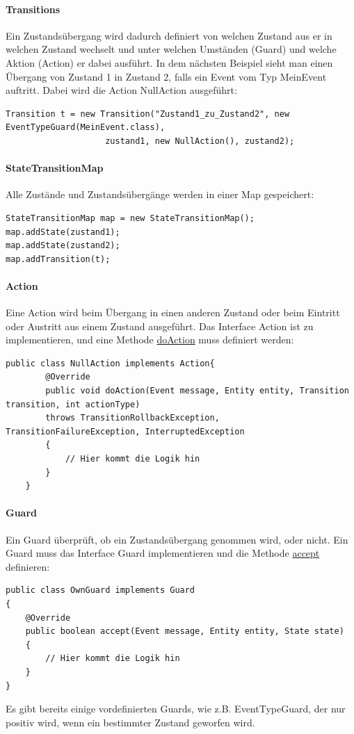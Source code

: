 \documentclass[fontsize=12pt,a4paper,final]{scrartcl}[2003/01/01]
\begin{document}
\paragraph{Transitions}
Ein Zustandsübergang wird dadurch definiert von welchen Zustand aus er in welchen Zustand wechselt und unter welchen Umständen (Guard) und welche Aktion (Action) er dabei ausführt. In dem nächsten Beispiel sieht man einen Übergang von Zustand 1 in Zustand 2, falls ein Event vom Typ MeinEvent auftritt. Dabei wird die Action NullAction ausgeführt:
\begin{lstlisting}
Transition t = new Transition("Zustand1_zu_Zustand2", new EventTypeGuard(MeinEvent.class),
                    zustand1, new NullAction(), zustand2);
\end{lstlisting}

\paragraph{StateTransitionMap}
Alle Zustände und Zustandsübergänge werden in einer Map gespeichert:
\begin{lstlisting}
StateTransitionMap map = new StateTransitionMap();
map.addState(zustand1);
map.addState(zustand2);
map.addTransition(t);
\end{lstlisting}

\paragraph{Action}
Eine Action wird beim Übergang in einen anderen Zustand oder beim Eintritt oder Austritt aus einem Zustand ausgeführt. Das Interface Action ist zu implementieren, und eine Methode \underline{doAction} muss definiert werden:
\begin{lstlisting}
public class NullAction implements Action{
        @Override
        public void doAction(Event message, Entity entity, Transition transition, int actionType) 
        throws TransitionRollbackException, TransitionFailureException, InterruptedException
        {
            // Hier kommt die Logik hin
        }
    }
\end{lstlisting}

\paragraph{Guard}
Ein Guard überprüft, ob ein Zustandsübergang genommen wird, oder nicht. Ein Guard muss das Interface Guard implementieren und die Methode \underline{accept} definieren:
\begin{lstlisting}
public class OwnGuard implements Guard
{
    @Override
    public boolean accept(Event message, Entity entity, State state)
    {
        // Hier kommt die Logik hin
    }   
}
\end{lstlisting}
Es gibt bereits einige vordefinierten Guards, wie z.B. EventTypeGuard, der nur positiv wird, wenn ein bestimmter Zustand geworfen wird.
\end{document}
